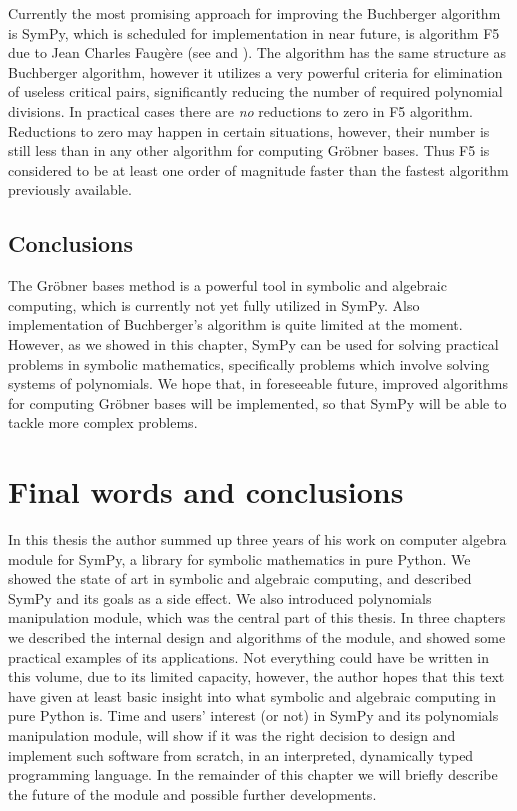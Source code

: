 Currently the most promising approach for improving the Buchberger algorithm is SymPy, which is scheduled
for implementation in near future, is algorithm F5 due to Jean Charles Faugère (see \cite{Faugere2002f5} and
\cite{Stegers2006f5}). The algorithm has the same structure as Buchberger algorithm, however it utilizes a very
powerful criteria for elimination of useless critical pairs, significantly reducing the number of required
polynomial divisions.  In practical cases there are \emph{no} reductions to zero in F5 algorithm. Reductions to
zero may happen in certain situations, however, their number is still less than in any other algorithm for
computing Gröbner bases. Thus F5 is considered to be at least one order of magnitude faster than the
fastest algorithm previously available.


\section{Conclusions}

The Gröbner bases method is a powerful tool in symbolic and algebraic computing, which is currently
not yet fully utilized in SymPy. Also implementation of Buchberger's algorithm is quite limited at
the moment. However, as we showed in this chapter, SymPy can be used for solving practical problems
in symbolic mathematics, specifically problems which involve solving systems of polynomials. We hope
that, in foreseeable future, improved algorithms for computing Gröbner bases will be implemented,
so that SymPy will be able to tackle more complex problems.



\chapter{Final words and conclusions}\label{thesis-conclusions}

In this thesis the author summed up three years of his work on computer algebra module for
SymPy, a library for symbolic mathematics in pure Python. We showed the state of art in
symbolic and algebraic computing, and described SymPy and its goals as a side effect. We
also introduced polynomials manipulation module, which was the central part of this thesis.
In three chapters we described the internal design and algorithms of the module, and showed
some practical examples of its applications. Not everything could have be written in this
volume, due to its limited capacity, however, the author hopes that this text have given
at least basic insight into what symbolic and algebraic computing in pure Python is. Time
and users' interest (or not) in SymPy and its polynomials manipulation module, will show
if it was the right decision to design and implement such software from scratch, in an
interpreted, dynamically typed programming language. In the remainder of this chapter we
will briefly describe the future of the module and possible further developments.



